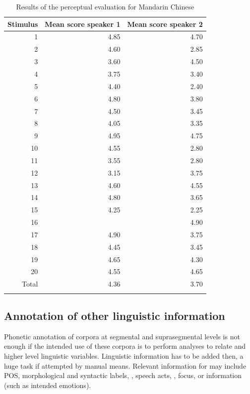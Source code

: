 \documentclass[output=paper]{langsci/langscibook}
\begin{document}
\begin{table}
\footnotesize
\begin{tabular}{rrr}
\lsptoprule
Stimulus & Mean score speaker 1 & Mean score speaker 2\\
\midrule
1 & 4.85 & 4.70\\
2 & 4.60 & 2.85\\
3 & 3.60 & 4.50\\
4 & 3.75 & 3.40\\
5 & 4.40 & 2.40\\
6 & 4.80 & 3.80\\
7 & 4.50 & 3.45\\
8 & 4.05 & 3.35\\
9 & 4.95 & 4.75\\
10 & 4.55 & 2.80\\
11 & 3.55 & 2.80\\
12 & 3.15 & 3.75\\
13 & 4.60 & 4.55\\
14 & 4.80 & 3.65\\
15 & 4.25 & 2.25\\
16 &  & 4.90\\
17 & 4.90 & 3.75\\
18 & 4.45 & 3.45\\
19 & 4.65 & 4.30\\
20 & 4.55 & 4.65\\
\midrule
Total & 4.36 & 3.70\\
\lspbottomrule
\end{tabular}
\caption{Results of the perceptual evaluation for Mandarin Chinese \citep{Yao2010}}
\label{tab:gar:4}
\end{table}

\subsection{Annotation of other linguistic information}

Phonetic annotation of corpora at segmental and suprasegmental levels is not enough if the intended use of these corpora is to perform analyses to relate  and higher level linguistic variables. Linguistic information has to be added then, a huge task if attempted by manual means. Relevant information for  may include POS, morphological and syntactic labels, , speech acts, , focus, or  information (such as intended emotions).
\end{document}
